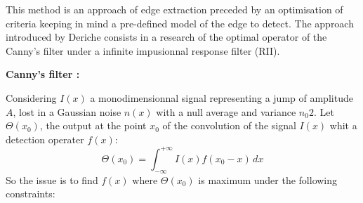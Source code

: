 This method is an approach of edge extraction preceded by an optimisation of criteria keeping in mind a pre-defined model of the edge to detect. 
The approach introduced by Deriche consists in a research of the optimal operator of the Canny's filter under a infinite impusionnal response filter (RII).

\medskip
{\large \bf Canny's filter :}

\nopagebreak

Considering $I(x)$ a monodimensionnal signal representing a jump of amplitude $A$, lost in a Gaussian noise $n(x)$ with a null average and variance $n_{0}{2}$.
Let $\Theta (x_{0})$, the output at the point $x_{0}$ of the convolution of the signal $I(x)$ whit a detection operater $f(x)$:
\[ 
\Theta(x_{0}) = \int_{-\infty}^{+\infty}I(x) f(x_{0}-x)\,dx 
\]
So the issue is to find $f(x)$ where $\Theta (x_{0})$ is maximum under the following constraints:

